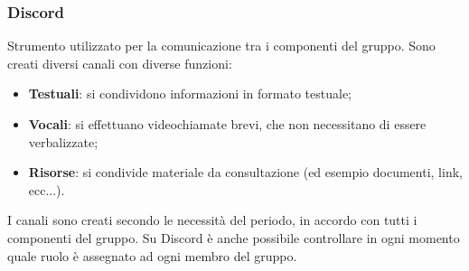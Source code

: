 \subsubsection{Discord}
Strumento utilizzato per la comunicazione tra i componenti del gruppo. Sono creati diversi canali con diverse funzioni:
\begin{itemize}
	\item \textbf{Testuali}: si condividono informazioni in formato testuale;
	\item \textbf{Vocali}: si effettuano videochiamate brevi, che non necessitano di essere verbalizzate;
	\item \textbf{Risorse}: si condivide materiale da consultazione (ed esempio documenti, link, ecc...). 
\end{itemize}
I canali sono creati secondo le necessità del periodo, in accordo con tutti i componenti del gruppo.
Su Discord è anche possibile controllare in ogni momento quale ruolo è assegnato ad ogni membro del gruppo.
